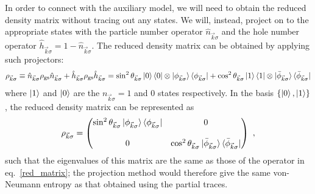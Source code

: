 \documentclass[reprint,hidelinks]{revtex4-2}
\begin{document}
In order to connect with the auxiliary model, we will need to obtain the reduced density matrix without tracing out any states. We will, instead, project on to the appropriate states with the particle number operator \(\hat n_{\vec k\sigma}\) and the hole number operator \(\hat h_{\vec k\sigma} = 1 - \hat n_{\vec k\sigma}\). The reduced density matrix can be obtained by applying such projectors:
\begin{equation}\begin{aligned}
	\rho_{\vec k\sigma} \equiv \hat n_{\vec k\sigma}\rho_\text{gs} \hat n_{\vec k\sigma} + \hat h_{\vec k\sigma}\rho_\text{gs} \hat h_{\vec k\sigma} = \sin^2\theta_{\vec k\sigma} \ket{0}\bra{0}\otimes\ket{\phi_{\vec k\sigma}}\bra{\phi_{\vec k\sigma}} + \cos^2\theta_{\vec k\sigma} \ket{1}\bra{1}\otimes\ket{\bar\phi_{\vec k\sigma}}\bra{\bar\phi_{\vec k\sigma}}\label{red_matrix_projection}
\end{aligned}\end{equation}
where \(\ket{1}\) and \(\ket{0}\) are the \(n_{\vec k\sigma}=1\) and 0 states respectively. In the basis \(\left\{ \ket{0}, \ket{1} \right\} \), the reduced density matrix can be represented as
\begin{equation}\begin{aligned}
	\rho_{\vec k\sigma} = \begin{pmatrix}\sin^2\theta_{\vec k\sigma} \ket{\phi_{\vec k\sigma}}\bra{\phi_{\vec k\sigma}} & 0 \\ \\
	0 & \cos^2\theta_{\vec k\sigma} \ket{\bar\phi_{\vec k\sigma}}\bra{\bar\phi_{\vec k\sigma}}
	\end{pmatrix} ~,
\end{aligned}\end{equation}
such that the eigenvalues of this matrix are the same as those of the operator in eq.~\ref{red_matrix}; the projection method would therefore give the same von-Neumann entropy as that obtained using the partial traces.
\end{document}
